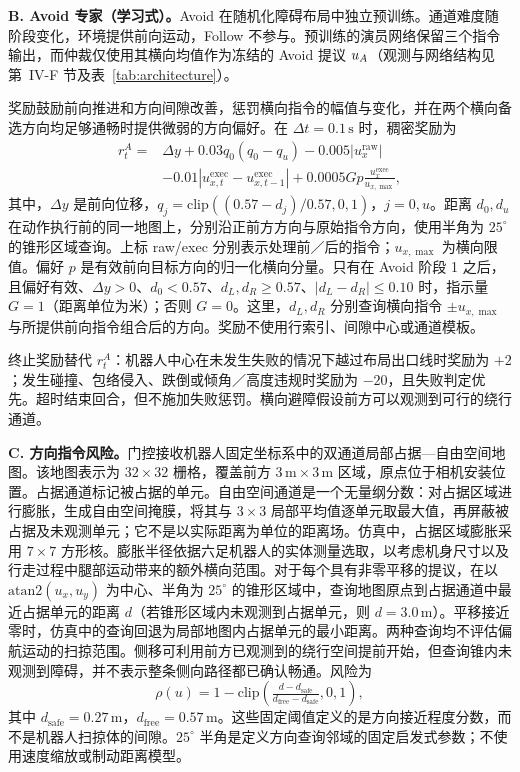 \textbf{B. Avoid 专家（学习式）。}Avoid 在随机化障碍布局中独立预训练。通道难度随阶段变化，环境提供前向运动，Follow 不参与。预训练的演员网络保留三个指令输出，而仲裁仅使用其横向均值作为冻结的 Avoid 提议 $u_{A}$（观测与网络结构见第~IV-F 节及表~\ref{tab:architecture}）。

奖励鼓励前向推进和方向间隙改善，惩罚横向指令的幅值与变化，并在两个横向备选方向均足够通畅时提供微弱的方向偏好。在 $\Delta t=0.1\,\mathrm{s}$ 时，稠密奖励为
\begin{equation}
\begin{aligned}
r_t^A={}&\Delta y+0.03q_0(q_0-q_u)-0.005|u_x^{\mathrm{raw}}|\\
&-0.01|u_{x,t}^{\mathrm{exec}}-u_{x,t-1}^{\mathrm{exec}}|
+0.0005Gp\tfrac{u_x^{\mathrm{exec}}}{u_{x,\max}},
\end{aligned}
\label{eq:avoid_reward}
\end{equation}
其中，$\Delta y$ 是前向位移，$q_j=\mathrm{clip}((0.57-d_j)/0.57,0,1)$，$j=0,u$。距离 $d_0,d_u$ 在动作执行前的同一地图上，分别沿正前方方向与原始指令方向，使用半角为 $25^\circ$ 的锥形区域查询。上标 raw/exec 分别表示处理前／后的指令；$u_{x,\max}$ 为横向限值。偏好 $p$ 是有效前向目标方向的归一化横向分量。只有在 Avoid 阶段 1 之后，且偏好有效、$\Delta y>0$、$d_0<0.57$、$d_L,d_R\ge0.57$、$|d_L-d_R|\le0.10$ 时，指示量 $G=1$（距离单位为米）；否则 $G=0$。这里，$d_L,d_R$ 分别查询横向指令 $\pm u_{x,\max}$ 与所提供前向指令组合后的方向。奖励不使用行索引、间隙中心或通道模板。

终止奖励替代 $r_t^A$：机器人中心在未发生失败的情况下越过布局出口线时奖励为 $+2$；发生碰撞、包络侵入、跌倒或倾角／高度违规时奖励为 $-20$，且失败判定优先。超时结束回合，但不施加失败惩罚。横向避障假设前方可以观测到可行的绕行通道。

\textbf{C. 方向指令风险。}门控接收机器人固定坐标系中的双通道局部占据—自由空间地图。该地图表示为 $32\times32$ 栅格，覆盖前方 $3\,\mathrm{m}\times3\,\mathrm{m}$ 区域，原点位于相机安装位置。占据通道标记被占据的单元。自由空间通道是一个无量纲分数：对占据区域进行膨胀，生成自由空间掩膜，将其与 $3\times3$ 局部平均值逐单元取最大值，再屏蔽被占据及未观测单元；它不是以实际距离为单位的距离场。仿真中，占据区域膨胀采用 $7\times7$ 方形核。膨胀半径依据六足机器人的实体测量选取，以考虑机身尺寸以及行走过程中腿部运动带来的额外横向范围。对于每个具有非零平移的提议，在以 $\mathrm{atan2}(u_x,u_y)$ 为中心、半角为 $25^\circ$ 的锥形区域中，查询地图原点到占据通道中最近占据单元的距离 $d$（若锥形区域内未观测到占据单元，则 $d=3.0\,\mathrm{m}$）。平移接近零时，仿真中的查询回退为局部地图内占据单元的最小距离。两种查询均不评估偏航运动的扫掠范围。侧移可利用前方已观测到的绕行空间提前开始，但查询锥内未观测到障碍，并不表示整条侧向路径都已确认畅通。风险为
\begin{equation}
\rho(u)=1-\mathrm{clip}\!\left(\tfrac{d-d_{\mathrm{safe}}}{d_{\mathrm{free}}-d_{\mathrm{safe}}},0,1\right),
\end{equation}
其中 $d_{\mathrm{safe}}=0.27\,\mathrm{m}$，$d_{\mathrm{free}}=0.57\,\mathrm{m}$。这些固定阈值定义的是方向接近程度分数，而不是机器人扫掠体的间隙。$25^\circ$ 半角是定义方向查询邻域的固定启发式参数；不使用速度缩放或制动距离模型。

